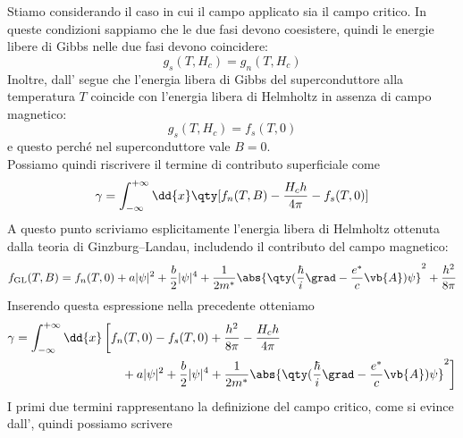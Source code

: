 Stiamo considerando il caso in cui il campo applicato sia il campo critico. In queste condizioni sappiamo che le due fasi devono coesistere, quindi le energie libere di Gibbs nelle due fasi devono coincidere:
\begin{equation*}
   g_s(T, H_c)=g_n(T, H_c)
\end{equation*}
Inoltre, dall' segue che l'energia libera di Gibbs del superconduttore alla temperatura $T$ coincide con l'energia libera di Helmholtz in assenza di campo magnetico:
\begin{equation*}
   g_s(T, H_c)=f_s(T,0)
\end{equation*}
e questo perché nel superconduttore vale $B=0$.\\
Possiamo quindi riscrivere il termine di contributo superficiale come
\begin{equation*}
   \gamma=\int_{-\infty}^{+\infty} \dd{x} \qty[ f_n(T,B) - \frac{H_c h}{4\pi} - f_s(T,0) ]
\end{equation*}
A questo punto scriviamo esplicitamente l'energia libera di Helmholtz ottenuta dalla teoria di Ginzburg--Landau, includendo il contributo del campo magnetico:
\begin{equation*}
   f_{\rm GL}(T,B)
   =
   f_n(T,0)
   +
   a|\psi|^2
   +
   \frac{b}{2}|\psi|^4
   +
   \frac{1}{2m^*}
   \abs{
      \qty(
         \frac{\hbar}{i}\grad
         -
         \frac{e^*}{c}\vb{A}
      )\psi
   }^2
   +
   \frac{h^2}{8\pi}
\end{equation*}
Inserendo questa espressione nella precedente otteniamo
\begin{equation*}
   \begin{split}
      \gamma
      &=
      \int_{-\infty}^{+\infty}\dd{x}
      \left[
      f_n(T,0)-f_s(T,0)
      +
      \frac{h^2}{8\pi}
      -
      \frac{H_c h}{4\pi}
      \right.
      \\
      &
      \left.
      \hphantom{=\int_{-\infty}^{+\infty}\dd{x}\left[\right.}
      \quad
      +
      a|\psi|^2
      +
      \frac{b}{2}|\psi|^4
      +
      \frac{1}{2m^*}
      \abs{
         \qty(
            \frac{\hbar}{i}\grad
            -
            \frac{e^*}{c}\vb{A}
         )\psi
      }^2
      \right]
   \end{split}
\end{equation*}
I primi due termini rappresentano la definizione del campo critico, come si evince dall', quindi possiamo scrivere
